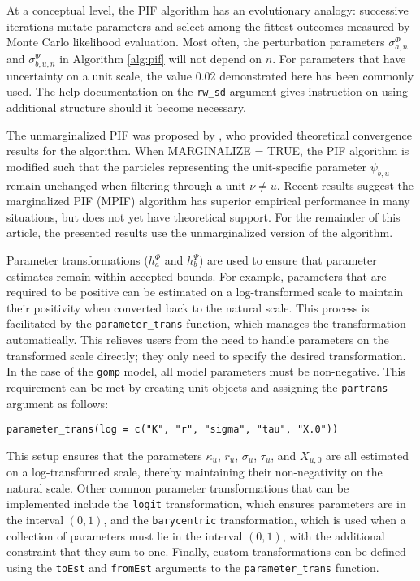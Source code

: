 At a conceptual level, the PIF algorithm has an evolutionary analogy: successive iterations mutate parameters and select among the fittest outcomes measured by Monte Carlo likelihood evaluation.
Most often, the perturbation parameters \(\sigma^\Phi_{a,n}\) and \(\sigma^\Psi_{b,u,n}\) in Algorithm \ref{alg:pif} will not depend on \(n\).
For parameters that have uncertainty on a unit scale, the value 0.02 demonstrated here has been commonly used.
The help documentation on the \texttt{rw\_sd} argument gives instruction on using additional structure should it become necessary.

The unmarginalized PIF was proposed by \citet{breto20}, who provided theoretical convergence results for the algorithm.
When MARGINALIZE = TRUE, the PIF algorithm is modified such that the particles representing the unit-specific parameter \(\psi_{b, u}\) remain unchanged when filtering through a unit \(\nu \neq u\).
Recent results suggest the marginalized PIF (MPIF) algorithm has superior empirical performance in many situations, but does not yet have theoretical support.
For the remainder of this article, the presented results use the unmarginalized version of the algorithm.

Parameter transformations (\(h^{\Phi}_{a}\) and \(h^{\Psi}_{b}\)) are used to ensure that parameter estimates remain within accepted bounds.
For example, parameters that are required to be positive can be estimated on a log-transformed scale to maintain their positivity when converted back to the natural scale.
This process is facilitated by the \texttt{parameter\_trans} function, which manages the transformation automatically.
This relieves users from the need to handle parameters on the transformed scale directly; they only need to specify the desired transformation.
In the case of the \texttt{gomp} model, all model parameters must be non-negative.
This requirement can be met by creating unit objects and assigning the \texttt{partrans} argument as follows:

\begin{verbatim}
parameter_trans(log = c("K", "r", "sigma", "tau", "X.0"))
\end{verbatim}

This setup ensures that the parameters \(\kappa_u\), \(r_u\), \(\sigma_u\), \(\tau_u\), and \(X_{u,0}\) are all estimated on a log-transformed scale, thereby maintaining their non-negativity on the natural scale.
Other common parameter transformations that can be implemented include the \texttt{logit} transformation, which ensures parameters are in the interval \((0, 1)\), and the \texttt{barycentric} transformation, which is used when a collection of parameters must lie in the interval \((0, 1)\), with the additional constraint that they sum to one.
Finally, custom transformations can be defined using the \texttt{toEst} and \texttt{fromEst} arguments to the \texttt{parameter\_trans} function.

